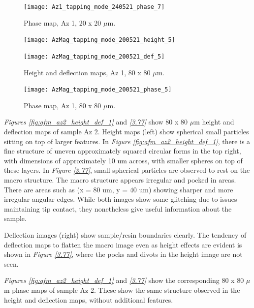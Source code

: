 \begin{figure}[H]
\centering
  \texttt{[image: Az1\_tapping\_mode\_240521\_phase\_7]}
\caption[Phase map, Az 1]{Phase map, Az 1, 20 x 20 $\mu$m.}
\label{fig:afm_az1_phase_7}
\end{figure}


\begin{figure}[H]
\centering
\begin{minipage}{.45\textwidth}
  \centering
  \texttt{[image: AzMag\_tapping\_mode\_200521\_height\_5]}
\end{minipage}
\begin{minipage}{.45\textwidth}
  \centering
  \texttt{[image: AzMag\_tapping\_mode\_200521\_def\_5]}
\end{minipage}
\caption[Height and deflection maps, Az 1]{Height and deflection maps, Az 1, 80 x 80 $\mu$m.}
\label{fig:afm_az1_height_def_8}
\end{figure}

\begin{figure}[H]
\centering
  \texttt{[image: AzMag\_tapping\_mode\_200521\_phase\_5]}
\caption[Phase map, Az 1]{Phase map, Az 1, 80 x 80 $\mu$m.}
\label{fig:afm_az1_phase_8}
\end{figure}




\textit{Figures \ref{fig:afm_az2_height_def_1}} and \textit{\ref{3.77}} show 80 x 80 $\mu$m height and deflection maps of sample Az 2. Height maps (left) show spherical small particles sitting on top of larger features. In \textit{Figure \ref{fig:afm_az2_height_def_1}}, there is a fine structure of uneven approximately squared circular forms in the top right, with dimensions of approximately 10 um across, with smaller spheres on top of these layers. In \textit{Figure \ref{3.77}}, small spherical particles are observed to rest on the macro structure. The macro structure appears irregular and pocked in areas. There are areas such as (x = 80 um, y = 40 um) showing sharper and more irregular angular edges. While both images show some glitching due to issues maintaining tip contact, they nonetheless give useful information about the sample.

Deflection images (right) show sample/resin boundaries clearly. The tendency of deflection maps to flatten the macro image even as height effects are evident is shown in \textit{Figure \ref{3.77}}, where the pocks and divots in the height image are not seen.

\textit{Figures \ref{fig:afm_az2_height_def_1}} and \textit{\ref{3.77}} show the corresponding 80 x 80 $\mu$m phase maps of sample Az 2. These show the same structure observed in the height and deflection maps, without additional features. 


